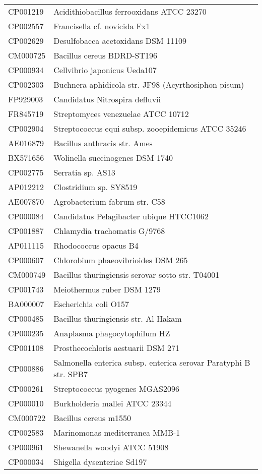 \begin{longtable}{ll}
CP001219 & Acidithiobacillus ferrooxidans ATCC 23270\\
CP002557 & Francisella cf. novicida Fx1\\
CP002629 & Desulfobacca acetoxidans DSM 11109\\
CM000725 & Bacillus cereus BDRD-ST196\\
CP000934 & Cellvibrio japonicus Ueda107\\
CP002303 & Buchnera aphidicola str. JF98 (Acyrthosiphon pisum)\\
FP929003 & Candidatus Nitrospira defluvii\\
FR845719 & Streptomyces venezuelae ATCC 10712\\
CP002904 & Streptococcus equi subsp. zooepidemicus ATCC 35246\\
AE016879 & Bacillus anthracis str. Ames\\
BX571656 & Wolinella succinogenes DSM 1740\\
CP002775 & Serratia sp. AS13\\
AP012212 & Clostridium sp. SY8519\\
AE007870 & Agrobacterium fabrum str. C58\\
CP000084 & Candidatus Pelagibacter ubique HTCC1062\\
CP001887 & Chlamydia trachomatis G/9768\\
AP011115 & Rhodococcus opacus B4\\
CP000607 & Chlorobium phaeovibrioides DSM 265\\
CM000749 & Bacillus thuringiensis serovar sotto str. T04001\\
CP001743 & Meiothermus ruber DSM 1279\\
BA000007 & Escherichia coli O157\\
CP000485 & Bacillus thuringiensis str. Al Hakam\\
CP000235 & Anaplasma phagocytophilum HZ\\
CP001108 & Prosthecochloris aestuarii DSM 271\\
CP000886 & Salmonella enterica subsp. enterica serovar Paratyphi B str. SPB7\\
CP000261 & Streptococcus pyogenes MGAS2096\\
CP000010 & Burkholderia mallei ATCC 23344\\
CM000722 & Bacillus cereus m1550\\
CP002583 & Marinomonas mediterranea MMB-1\\
CP000961 & Shewanella woodyi ATCC 51908\\
CP000034 & Shigella dysenteriae Sd197\\

\end{longtable}
